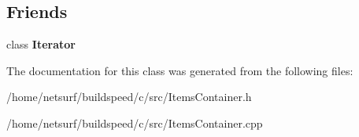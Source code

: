\subsection*{Friends}
\begin{DoxyCompactItemize}
\item 
class {\bfseries Iterator}\hypertarget{class_items_container_a9830fc407400559db7e7783cc10a9394}{}\label{class_items_container_a9830fc407400559db7e7783cc10a9394}

\end{DoxyCompactItemize}


The documentation for this class was generated from the following files\+:\begin{DoxyCompactItemize}
\item 
/home/netsurf/buildspeed/c/src/Items\+Container.\+h\item 
/home/netsurf/buildspeed/c/src/Items\+Container.\+cpp\end{DoxyCompactItemize}
